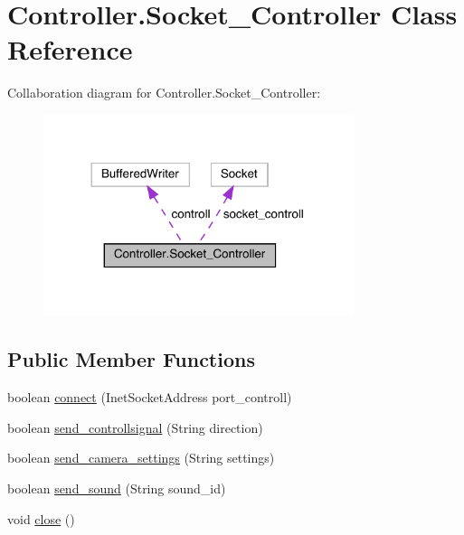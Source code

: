 \hypertarget{class_controller_1_1_socket___controller}{}\section{Controller.\+Socket\+\_\+\+Controller Class Reference}
\label{class_controller_1_1_socket___controller}


Collaboration diagram for Controller.\+Socket\+\_\+\+Controller\+:
\nopagebreak
\begin{figure}[H]
\begin{center}
\leavevmode
\includegraphics[width=257pt]{class_controller_1_1_socket___controller__coll__graph}
\end{center}
\end{figure}
\subsection*{Public Member Functions}
\begin{DoxyCompactItemize}
\item 
boolean \hyperlink{class_controller_1_1_socket___controller_a29b570104991b9a087f5a100c8cf368e}{connect} (Inet\+Socket\+Address port\+\_\+controll)
\item 
boolean \hyperlink{class_controller_1_1_socket___controller_a48847c95b991adf579a282a45e19f79e}{send\+\_\+controllsignal} (String direction)
\item 
boolean \hyperlink{class_controller_1_1_socket___controller_a143d54b3c69a8f3ffd01c24c183cb186}{send\+\_\+camera\+\_\+settings} (String settings)
\item 
boolean \hyperlink{class_controller_1_1_socket___controller_a2df08fcd76b146de308fa5a0e117cb34}{send\+\_\+sound} (String sound\+\_\+id)
\item 
void \hyperlink{class_controller_1_1_socket___controller_a277036a9029a0289a8f370e73484c212}{close} ()
\end{DoxyCompactItemize}


